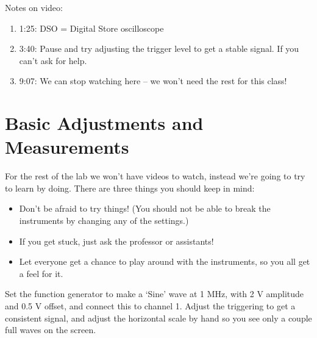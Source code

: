 \documentclass[12pt, letterpaper]{article}
\begin{document}
Notes on video:
\begin{enumerate}
	\item 1:25: DSO = Digital Store oscilloscope
	\item 3:40: Pause and try adjusting the trigger level to get a stable signal.  If you can't ask for help.
	\item 9:07: We can stop watching here -- we won't need the rest for this class!
\end{enumerate}

\section{Basic Adjustments and Measurements}
For the rest of the lab we won't have videos to watch, instead we're going to try to learn by doing.
There are three things you should keep in mind:
\begin{itemize}
	\item Don't be afraid to try things!  (You should not be able to break the instruments by changing any of the settings.)
	\item If you get stuck, just ask the professor or assistants!
	\item Let everyone get a chance to play around with the instruments, so you all get a feel for it.
\end{itemize}

Set the function generator to make a `Sine' wave at 1 MHz, with 2 V amplitude and 0.5 V offset, and connect this to channel 1.
	Adjust the triggering to get a consistent signal, and adjust the horizontal scale by hand so you see only a couple full waves on the screen.
	
\end{document}
